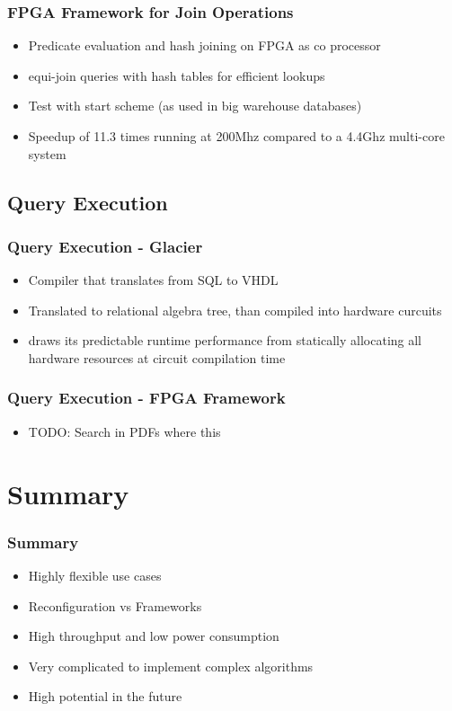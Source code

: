 \documentclass{beamer}
\begin{document}
\begin{frame}
	\frametitle{FPGA Framework for Join Operations}
	\begin{itemize}
		\item Predicate evaluation and hash joining on FPGA as co processor
		\item equi-join queries with hash tables for efficient lookups
		\item Test with start scheme (as used in big warehouse databases)
		\item Speedup of 11.3 times running at 200Mhz compared to a 4.4Ghz multi-core system
	\end{itemize}
\end{frame}

\subsection{Query Execution}
\begin{frame}
\frametitle{Query Execution - Glacier}
\begin{itemize}
	\item Compiler that translates from SQL to VHDL
	\item Translated to relational algebra tree, than compiled into hardware curcuits
	\item draws its predictable runtime performance from statically allocating all hardware resources at circuit compilation time
\end{itemize}
\end{frame}

\begin{frame}
	\frametitle{Query Execution - FPGA Framework}
	\begin{itemize}
		\item TODO: Search in PDFs where this 
	\end{itemize}
\end{frame}

\section{Summary}
\begin{frame}
	\frametitle{Summary}
	\begin{itemize}
		\item Highly flexible use cases
		\item Reconfiguration vs Frameworks
		\item High throughput and low power consumption
		\item Very complicated to implement complex algorithms
		\item High potential in the future
	\end{itemize}
\end{frame}
\end{document}
